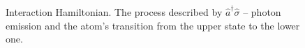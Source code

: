 \begin{figure}
\centering



\caption{Interaction Hamiltonian. The process described by $\hat{a}^{\dag}\hat{\sigma}$ – photon emission and the atom's transition from the upper state to the lower one.}
\label{figPart1Ch2_2_3}
\end{figure}
